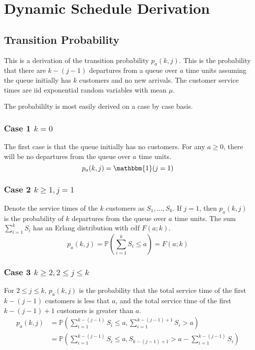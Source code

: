 \chapter{Dynamic Schedule Derivation}
\section{Transition Probability}
This is a derivation of the transition probability $p_{a} (k, j)$. This is the probability that there are $k - (j - 1)$ departures from a queue over $a$ time units assuming the queue initially has $k$ customers and no new arrivals. The customer service times are iid exponential random variables with mean $\mu$.

The probabililty is most easily derived on a case by case basis.

\subsection{Case 1 $k = 0$}
The first case is that the queue initially has no customers. For any $a \geq 0$, there will be no departures from the queue over $a$ time units.
\begin{equation}
	p_{a} (k, j) = \mathbbm{1} (j = 1)
\end{equation}

\subsection{Case 2 $k \geq 1, j = 1$}
Denote the service times of the $k$ customers as $S_{1}, \ldots, S_{k}$. If $j = 1$, then $p_{a} (k, j)$ is the probability of $k$ departures from the queue over $a$ time units. The sum $\sum_{i = 1}^{k} S_{i}$ has an Erlang distribution with cdf $F (a; k)$.
\begin{equation}
	p_{a} (k, j) = \mathbb{P} \left( \sum_{i = 1}^{k} S_{i} \leq a \right) = F (a; k)
\end{equation}

\subsection{Case 3 $k \geq 2, 2 \leq j \leq k$}
For $2 \leq j \leq k$, $p_{a} (k, j)$ is the probability that the total service time of the first $k - (j - 1)$ customers is less that $a$, and the total service time of the first $k - (j - 1) + 1$ customers is greater than $a$.
\begin{equation}
	\begin{split}
		p_{a} (k, j)
		& = \mathbb{P} \left( \sum_{i = 1}^{k - (j - 1)} S_{i} \leq a, \sum_{i = 1}^{k - (j - 1) + 1} S_{i} > a \right) \\
		& = \mathbb{P} \left( \sum_{i = 1}^{k - (j - 1)} S_{i} \leq a, S_{k - (j - 1) + 1} > a - \sum_{i = 1}^{k - (j - 1)} S_{i} \right) \\
	\end{split}
\end{equation}

